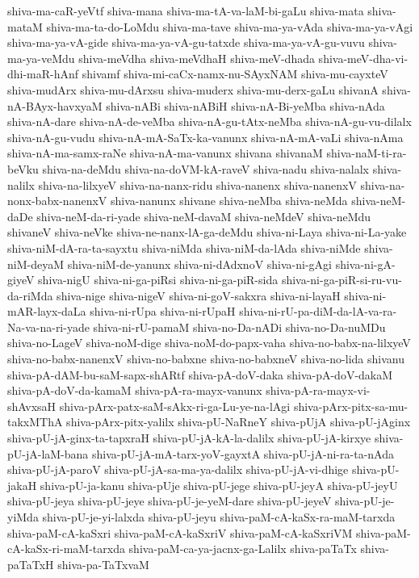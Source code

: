 {shiva-ma-caR-yeVtf
shiva-mana
shiva-ma-tA-va-laM-bi-gaLu
shiva-mata
shiva-mataM
shiva-ma-ta-do-LoMdu
shiva-ma-tave
shiva-ma-ya-vAda
shiva-ma-ya-vAgi
shiva-ma-ya-vA-gide
shiva-ma-ya-vA-gu-tatxde
shiva-ma-ya-vA-gu-vuvu
shiva-ma-ya-veMdu
shiva-meVdha
shiva-meVdhaH
shiva-meV-dhada
shiva-meV-dha-vi-dhi-maR-hAnf
shivamf
shiva-mi-caCx-namx-nu-SAyxNAM
shiva-mu-cayxteV
shiva-mudArx
shiva-mu-dArxsu
shiva-muderx
shiva-mu-derx-gaLu
shivanA
shiva-nA-BAyx-havxyaM
shiva-nABi
shiva-nABiH
shiva-nA-Bi-yeMba
shiva-nAda
shiva-nA-dare
shiva-nA-de-veMba
shiva-nA-gu-tAtx-neMba
shiva-nA-gu-vu-dilalx
shiva-nA-gu-vudu
shiva-nA-mA-SaTx-ka-vanunx
shiva-nA-mA-vaLi
shiva-nAma
shiva-nA-ma-samx-raNe
shiva-nA-ma-vanunx
shivana
shivanaM
shiva-naM-ti-ra-beVku
shiva-na-deMdu
shiva-na-doVM-kA-raveV
shiva-nadu
shiva-nalalx
shiva-nalilx
shiva-na-lilxyeV
shiva-na-nanx-ridu
shiva-nanenx
shiva-nanenxV
shiva-na-nonx-babx-nanenxV
shiva-nanunx
shivane
shiva-neMba
shiva-neMda
shiva-neM-daDe
shiva-neM-da-ri-yade
shiva-neM-davaM
shiva-neMdeV
shiva-neMdu
shivaneV
shiva-neVke
shiva-ne-nanx-lA-ga-deMdu
shiva-ni-Laya
shiva-ni-La-yake
shiva-niM-dA-ra-ta-sayxtu
shiva-niMda
shiva-niM-da-lAda
shiva-niMde
shiva-niM-deyaM
shiva-niM-de-yanunx
shiva-ni-dAdxnoV
shiva-ni-gAgi
shiva-ni-gA-giyeV
shiva-nigU
shiva-ni-ga-piRsi
shiva-ni-ga-piR-sida
shiva-ni-ga-piR-si-ru-vu-da-riMda
shiva-nige
shiva-nigeV
shiva-ni-goV-sakxra
shiva-ni-layaH
shiva-ni-mAR-layx-daLa
shiva-ni-rUpa
shiva-ni-rUpaH
shiva-ni-rU-pa-diM-da-lA-va-ra-Na-va-na-ri-yade
shiva-ni-rU-pamaM
shiva-no-Da-nADi
shiva-no-Da-nuMDu
shiva-no-LageV
shiva-noM-dige
shiva-noM-do-papx-vaha
shiva-no-babx-na-lilxyeV
shiva-no-babx-nanenxV
shiva-no-babxne
shiva-no-babxneV
shiva-no-lida
shivanu
shiva-pA-dAM-bu-saM-sapx-shARtf
shiva-pA-doV-daka
shiva-pA-doV-dakaM
shiva-pA-doV-da-kamaM
shiva-pA-ra-mayx-vanunx
shiva-pA-ra-mayx-vi-shAvxsaH
shiva-pArx-patx-saM-sAkx-ri-ga-Lu-ye-na-lAgi
shiva-pArx-pitx-sa-mu-takxMThA
shiva-pArx-pitx-yalilx
shiva-pU-NaRneY
shiva-pUjA
shiva-pU-jAginx
shiva-pU-jA-ginx-ta-tapxraH
shiva-pU-jA-kA-la-dalilx
shiva-pU-jA-kirxye
shiva-pU-jA-laM-bana
shiva-pU-jA-mA-tarx-yoV-gayxtA
shiva-pU-jA-ni-ra-ta-nAda
shiva-pU-jA-paroV
shiva-pU-jA-sa-ma-ya-dalilx
shiva-pU-jA-vi-dhige
shiva-pU-jakaH
shiva-pU-ja-kanu
shiva-pUje
shiva-pU-jege
shiva-pU-jeyA
shiva-pU-jeyU
shiva-pU-jeya
shiva-pU-jeye
shiva-pU-je-yeM-dare
shiva-pU-jeyeV
shiva-pU-je-yiMda
shiva-pU-je-yi-lalxda
shiva-pU-jeyu
shiva-paM-cA-kaSx-ra-maM-tarxda
shiva-paM-cA-kaSxri
shiva-paM-cA-kaSxriV
shiva-paM-cA-kaSxriVM
shiva-paM-cA-kaSx-ri-maM-tarxda
shiva-paM-ca-ya-jacnx-ga-Lalilx
shiva-paTaTx
shiva-paTaTxH
shiva-pa-TaTxvaM
}
